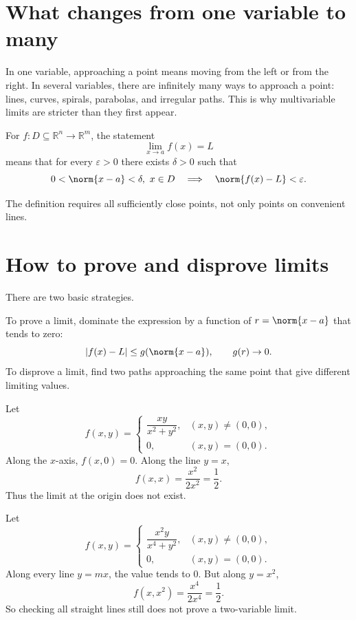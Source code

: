 
\section{What changes from one variable to many}

In one variable, approaching a point means moving from the left or from the right.  In several variables, there are infinitely many ways to approach a point: lines, curves, spirals, parabolas, and irregular paths.  This is why multivariable limits are stricter than they first appear.

\begin{definition}
For \(f:D\subseteq\mathbb R^n\to\mathbb R^m\), the statement
\[
  \lim_{x\to a}f(x)=L
\]
means that for every \(\varepsilon>0\) there exists \(\delta>0\) such that
\[
  0<\norm{x-a}<\delta,\ x\in D
  \quad\Longrightarrow\quad
  \norm{f(x)-L}<\varepsilon.
\]
\end{definition}

The definition requires all sufficiently close points, not only points on convenient lines.

\section{How to prove and disprove limits}

There are two basic strategies.

To prove a limit, dominate the expression by a function of \(r=\norm{x-a}\) that tends to zero:
\[
  |f(x)-L|\le g(\norm{x-a}),\qquad g(r)\to0.
\]
To disprove a limit, find two paths approaching the same point that give different limiting values.

\begin{example}
Let
\[
  f(x,y)=
  \begin{cases}
  \dfrac{xy}{x^2+y^2},&(x,y)\ne(0,0),\\[3pt]
  0,&(x,y)=(0,0).
  \end{cases}
\]
Along the \(x\)-axis, \(f(x,0)=0\).  Along the line \(y=x\),
\[
  f(x,x)=\frac{x^2}{2x^2}=\frac12.
\]
Thus the limit at the origin does not exist.
\end{example}

\begin{example}
Let
\[
  f(x,y)=
  \begin{cases}
  \dfrac{x^2y}{x^4+y^2},&(x,y)\ne(0,0),\\[3pt]
  0,&(x,y)=(0,0).
  \end{cases}
\]
Along every line \(y=mx\), the value tends to \(0\).  But along \(y=x^2\),
\[
  f(x,x^2)=\frac{x^4}{2x^4}=\frac12.
\]
So checking all straight lines still does not prove a two-variable limit.
\end{example}

